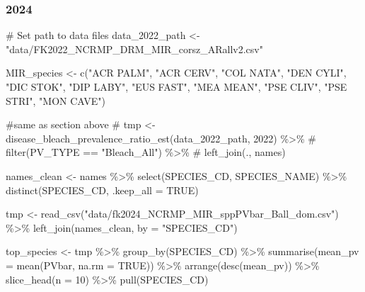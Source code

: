 \documentclass[
]{article}
\newenvironment{Shaded}{\begin{snugshade}}{\end{snugshade}}
\newcommand{\AttributeTok}[1]{\textcolor[rgb]{0.40,0.45,0.13}{#1}}
\newcommand{\CommentTok}[1]{\textcolor[rgb]{0.37,0.37,0.37}{#1}}
\newcommand{\ConstantTok}[1]{\textcolor[rgb]{0.56,0.35,0.01}{#1}}
\newcommand{\DecValTok}[1]{\textcolor[rgb]{0.68,0.00,0.00}{#1}}
\newcommand{\FunctionTok}[1]{\textcolor[rgb]{0.28,0.35,0.67}{#1}}
\newcommand{\NormalTok}[1]{\textcolor[rgb]{0.00,0.23,0.31}{#1}}
\newcommand{\OtherTok}[1]{\textcolor[rgb]{0.00,0.23,0.31}{#1}}
\newcommand{\SpecialCharTok}[1]{\textcolor[rgb]{0.37,0.37,0.37}{#1}}
\newcommand{\StringTok}[1]{\textcolor[rgb]{0.13,0.47,0.30}{#1}}
\begin{document}
\hypertarget{section-1}{%
\subsubsection{2024}\label{section-1}}

\begin{Shaded}
\begin{Highlighting}[]
\CommentTok{\# Set path to data files}
\NormalTok{data\_2022\_path }\OtherTok{\textless{}{-}} \StringTok{"data/FK2022\_NCRMP\_DRM\_MIR\_corsz\_ARallv2.csv"}


\NormalTok{MIR\_species }\OtherTok{\textless{}{-}} \FunctionTok{c}\NormalTok{(}\StringTok{"ACR PALM"}\NormalTok{, }\StringTok{"ACR CERV"}\NormalTok{, }\StringTok{"COL NATA"}\NormalTok{, }\StringTok{"DEN CYLI"}\NormalTok{, }\StringTok{"DIC STOK"}\NormalTok{, }\StringTok{"DIP LABY"}\NormalTok{, }\StringTok{"EUS FAST"}\NormalTok{, }\StringTok{"MEA MEAN"}\NormalTok{, }\StringTok{"PSE CLIV"}\NormalTok{, }\StringTok{"PSE STRI"}\NormalTok{, }\StringTok{"MON CAVE"}\NormalTok{)}

\CommentTok{\#same as section above}
\CommentTok{\# tmp \textless{}{-} disease\_bleach\_prevalence\_ratio\_est(data\_2022\_path, 2022) \%\textgreater{}\%}
\CommentTok{\#   filter(PV\_TYPE == "Bleach\_All") \%\textgreater{}\%}
\CommentTok{\#   left\_join(., names)}

\NormalTok{names\_clean }\OtherTok{\textless{}{-}}\NormalTok{ names }\SpecialCharTok{\%\textgreater{}\%}
  \FunctionTok{select}\NormalTok{(SPECIES\_CD, SPECIES\_NAME) }\SpecialCharTok{\%\textgreater{}\%}
  \FunctionTok{distinct}\NormalTok{(SPECIES\_CD, }\AttributeTok{.keep\_all =} \ConstantTok{TRUE}\NormalTok{)}

\NormalTok{tmp }\OtherTok{\textless{}{-}} \FunctionTok{read\_csv}\NormalTok{(}\StringTok{"data/fk2024\_NCRMP\_MIR\_sppPVbar\_Ball\_dom.csv"}\NormalTok{) }\SpecialCharTok{\%\textgreater{}\%}
    \FunctionTok{left\_join}\NormalTok{(names\_clean, }\AttributeTok{by =} \StringTok{"SPECIES\_CD"}\NormalTok{)}

\NormalTok{top\_species }\OtherTok{\textless{}{-}}\NormalTok{ tmp }\SpecialCharTok{\%\textgreater{}\%}
  \FunctionTok{group\_by}\NormalTok{(SPECIES\_CD) }\SpecialCharTok{\%\textgreater{}\%}
  \FunctionTok{summarise}\NormalTok{(}\AttributeTok{mean\_pv =} \FunctionTok{mean}\NormalTok{(PVbar, }\AttributeTok{na.rm =} \ConstantTok{TRUE}\NormalTok{)) }\SpecialCharTok{\%\textgreater{}\%}
  \FunctionTok{arrange}\NormalTok{(}\FunctionTok{desc}\NormalTok{(mean\_pv)) }\SpecialCharTok{\%\textgreater{}\%}
  \FunctionTok{slice\_head}\NormalTok{(}\AttributeTok{n =} \DecValTok{10}\NormalTok{) }\SpecialCharTok{\%\textgreater{}\%}  
  \FunctionTok{pull}\NormalTok{(SPECIES\_CD)}


\end{Highlighting}
\end{Shaded}
\end{document}
